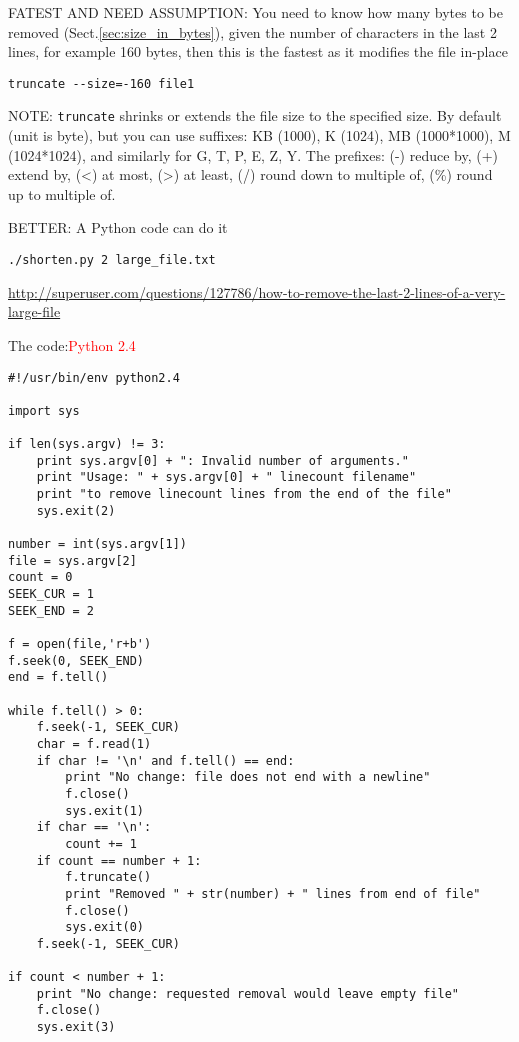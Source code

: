 FATEST AND NEED ASSUMPTION: You need to know how many bytes to be removed
(Sect.\ref{sec:size_in_bytes}), given the number of characters in the last 2
lines, for example 160 bytes, then this is the fastest as it modifies the file in-place
\begin{verbatim}
truncate --size=-160 file1
\end{verbatim}
NOTE: \verb!truncate! shrinks or extends the file size to the specified size. By
default (unit is byte), but you can use suffixes: KB (1000), K (1024), MB
(1000*1000), M (1024*1024), and similarly for G, T, P, E, Z, Y. The prefixes:
(-) reduce by, (+) extend by, (<) at most, (>) at least, (/) round down to
multiple of, (\%) round up to multiple of. 

BETTER: A Python code can do it
\begin{verbatim}
./shorten.py 2 large_file.txt
\end{verbatim}
\url{http://superuser.com/questions/127786/how-to-remove-the-last-2-lines-of-a-very-large-file}

The code:\textcolor{red}{Python 2.4}
\begin{verbatim}
#!/usr/bin/env python2.4

import sys

if len(sys.argv) != 3:
    print sys.argv[0] + ": Invalid number of arguments."
    print "Usage: " + sys.argv[0] + " linecount filename"
    print "to remove linecount lines from the end of the file"
    sys.exit(2)

number = int(sys.argv[1])
file = sys.argv[2]
count = 0
SEEK_CUR = 1
SEEK_END = 2

f = open(file,'r+b')
f.seek(0, SEEK_END)
end = f.tell()

while f.tell() > 0:
    f.seek(-1, SEEK_CUR)
    char = f.read(1)
    if char != '\n' and f.tell() == end:
        print "No change: file does not end with a newline"
        f.close()
        sys.exit(1)
    if char == '\n':
        count += 1
    if count == number + 1:
        f.truncate()
        print "Removed " + str(number) + " lines from end of file"
        f.close()
        sys.exit(0)
    f.seek(-1, SEEK_CUR)

if count < number + 1:
    print "No change: requested removal would leave empty file"
    f.close()
    sys.exit(3)
\end{verbatim}


